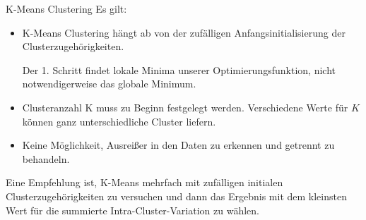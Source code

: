 \begin{defi}{K-Means Clustering}
    Es gilt:
    \begin{itemize}
        \item K-Means Clustering hängt ab von der zufälligen Anfangsinitialisierung der Clusterzugehörigkeiten.

              Der 1. Schritt findet lokale Minima unserer Optimierungsfunktion, nicht notwendigerweise das globale Minimum.
        \item Clusteranzahl K muss zu Beginn festgelegt werden.
              Verschiedene Werte für $K$ können ganz unterschiedliche Cluster liefern.
        \item Keine Möglichkeit, Ausreißer in den Daten zu erkennen und getrennt zu behandeln.
    \end{itemize}

    Eine Empfehlung ist, K-Means mehrfach mit zufälligen initialen Clusterzugehörigkeiten zu versuchen und dann das Ergebnis mit dem kleinsten Wert für die summierte Intra-Cluster-Variation zu wählen.
\end{defi}